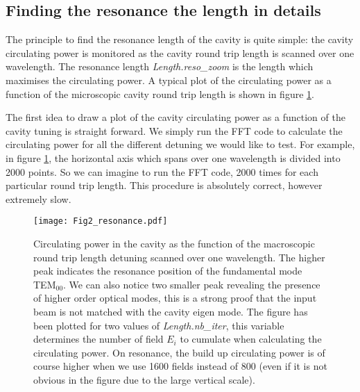 \subsection{Finding the resonance the length in details}
\label{sec2:3}
The principle to find the resonance length of the cavity is quite simple: the cavity circulating power is monitored as the cavity round trip length is scanned over one wavelength. The resonance length \textsl{Length.reso\_zoom} is the length which maximises the circulating power. A typical plot of the circulating power as a function of the microscopic cavity round trip length is shown in figure \ref{fig2:cavres}.

The first idea to draw a plot of the cavity circulating power as a function of the cavity tuning is straight forward. We simply run the FFT code to calculate the circulating power for all the different detuning we would like to test. For example, in figure \ref{fig2:cavres}, the horizontal axis which spans over one wavelength is divided into 2000 points. So we can imagine to run the FFT code, 2000 times for each particular round trip length. This procedure is absolutely correct, however extremely slow.


\begin{figure}
\begin{center}
\texttt{[image: Fig2\_resonance.pdf]}
\end{center}
\caption{\label{fig2:cavres} Circulating power in the cavity as the function of the macroscopic round trip length detuning scanned over one wavelength. The higher peak indicates the resonance position of the fundamental mode TEM$_{00}$. We can also notice two smaller peak revealing the presence of higher order optical modes, this is a strong proof that the input beam is not matched with the cavity eigen mode. The figure has been plotted for two values of \emph{Length.nb\_iter}, this variable determines the number of field $E_i$ to cumulate when calculating the circulating power. On resonance, the build up circulating power is of course higher when we use 1600 fields instead of 800 (even if it is not obvious in the figure due to the large vertical scale).}
\end{figure}




